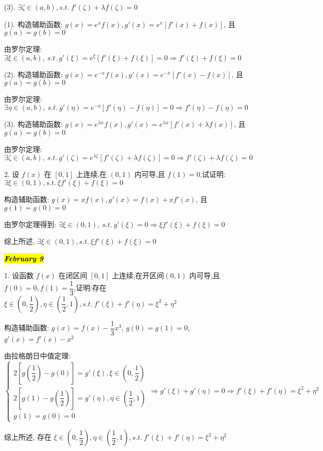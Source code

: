 (3). $\exists \zeta\in(a,b),s.t.\ f'(\zeta)+\lambda f(\zeta)=0$
\begin{solution}

	(1). 构造辅助函数: $g(x) = e^{x}f(x), g'(x) = e^{x}\left[f'(x) + f(x)\right]$, 且 $g(a) = g(b) = 0$

	由罗尔定理: $\exists \xi\in(a,b),\ s.t.\ g'(\xi) = e^{\xi}\left[f'(\xi) + f(\xi)\right] = 0\Rightarrow f'(\xi) + f(\xi) = 0$


	(2). 构造辅助函数: $g(x) = e^{-x}f(x), g'(x) = e^{-x}\left[f'(x) - f(x)\right]$, 且 $g(a) = g(b) = 0$

	由罗尔定理: $\exists \eta\in(a,b),\ s.t.\ g'(\eta) = e^{-\eta}\left[f'(\eta) - f(\eta)\right] = 0\Rightarrow f'(\eta) - f(\eta) = 0$


	(3). 构造辅助函数: $g(x) = e^{\lambda x}f(x), g'(x) = e^{\lambda x}\left[f'(x) + \lambda f(x)\right]$, 且 $g(a) = g(b) = 0$

	由罗尔定理: $\exists \zeta\in(a,b),\ s.t.\ g'(\zeta) = e^{\lambda\zeta}\left[f'(\zeta) + \lambda f(\zeta)\right] = 0\Rightarrow f'(\zeta) + \lambda f(\zeta) = 0$
\end{solution}

2. 设 $f(x)$ 在 $[0,1]$ 上连续,在 $(0,1)$ 内可导,且 $f(1)=0$,试证明:$\exists \xi\in(0,1),s.t.\ \xi f'(\xi) + f(\xi) = 0$
\begin{solution}

	构造辅助函数: $g(x) = xf(x), g'(x) = f(x) +xf'(x)$, 且 $g(1) = g(0) = 0$

	由罗尔定理得到: $\exists \xi\in(0,1),\ s.t.\ g'(\xi) = 0\Rightarrow \xi f'(\xi) + f(\xi) = 0$

	综上所述, $\exists \xi\in(0,1),s.t.\ \xi f'(\xi) + f(\xi) = 0$
\end{solution}

\hl{\textbf{\textit{February 9}}}

1. 设函数 $f(x)$ 在闭区间 $[0,1]$ 上连续,在开区间$(0,1)$ 内可导,且$f(0)=0,f(1)=\dfrac{1}{3}$,证明:存在 $\xi\in\left(0,\dfrac{1}{2}\right),\eta\in\left( \dfrac{1}{2},1\right),s.t.\ f'(\xi)+f'(\eta)=\xi^{2}+\eta^{2}$
\begin{solution}

	构造辅助函数: $g(x) = f(x) - \dfrac{1}{3}x^{3}$, $g(0) = g(1) = 0$, $g'(x) =f'(x) -x^{2}$

	由拉格朗日中值定理:
	$$\begin{cases}
		2\left[g(\dfrac{1}{2})-g(0)\right] = g'(\xi), \xi\in(0,\dfrac{1}{2})\\
		2\left[g(1)-g(\dfrac{1}{2})\right] = g'(\eta), \eta\in(\dfrac{1}{2},1)\\
		g(1) = g(0) = 0
	\end{cases}\Rightarrow g'(\xi) + g'(\eta) = 0\Rightarrow f'(\xi) + f'(\eta) =\xi^{2} +\eta^{2}$$

	综上所述, 存在 $\xi\in\left(0,\dfrac{1}{2}\right),\eta\in\left( \dfrac{1}{2},1\right),s.t.\ f'(\xi)+f'(\eta)=\xi^{2}+\eta^{2}$
\end{solution}

